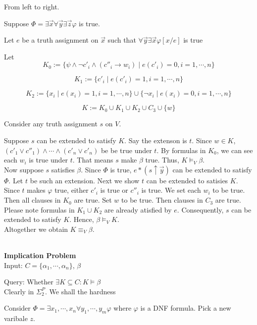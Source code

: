 \documentclass[12pt]{article}
\begin{document}
{\color{red} From left to right.\color{black}


Suppose $\Phi=\exists\vec{x}\forall\vec{y}\exists\vec{z}\varphi$ is true. 

Let $e$ be a truth assignment on $\vec{x}$ such that $\forall\vec{y}\exists\vec{x}\varphi[x/e]$ is true


Let $$K_0:=\{\psi\wedge \neg c'_i\wedge (c''_i\rightarrow w_i)\mid e(c'_i)=0, i=1,\cdots,n\}$$

$$K_1:=\{c'_i\mid e(c'_i)=1, i=1,\cdots,n\}$$

$$K_2:=\{x_i\mid e(x_i)=1, i=1,\cdots, n\}\cup\{\neg x_i\mid e(x_i)=0, i=1,\cdots,n\}$$

$$K:=K_0\cup K_1\cup K_2\cup C_3\cup\{w\}$$


Consider any truth assignment $s$ on $V$. 

Suppose $s$ can be extended to satisfy $K$. Say the extenson is $t$. Since $w\in K$, $(c'_1\vee c''_1)\wedge\cdots\wedge(c'_n\vee c'_n)$ be be true under $t$. By formulas in $K_0$, we can see each $w_i$ is true under $t$. That means $s$ make $\beta$ true. Thus, $K\models_V\beta$. \\

Now suppose $s$ satisfies $\beta$. Since $\Phi$ is true, $e*(s\uparrow\vec{y})$ can  be extended to satisfy $\Phi$. Let $t$ be such an extension. Next we show $t$ can be extended to satisies $K$. Since $t$ makes $\varphi$ true, either $c'_i$ is true or $c''_i$ is true. We set each $w_i$ to be true. Then all clauses in $K_0$ are true. Set $w$ to be true. Then clauses in $C_3$ are true. Please note formulas in $K_1\cup K_2$ are already atisfied by $e$. Consequently, $s$ can be extended to satisfy $K$.
Hence, $\beta\models_V K$.\\

Altogether we obtain $K\equiv_V \beta$.








\ \ \\

{\bf Implication Problem}\\

Input: $C=\{\alpha_1,\cdots,\alpha_n\}$, $\beta$

Query: Whether $\exists K\subseteq C: K\models \beta$\\ 

Clearly in $\Sigma_2^P$. We shall the hardness

Consider $\Phi=\exists x_1,\cdots, x_n\forall y_1,\cdots,y_m \varphi$ where $\varphi$ is a DNF formula. Pick a new varibale $z$.

}
\end{document}
